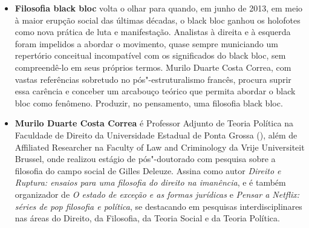 \begin{itemize}
\item \textbf{Filosofia black bloc} volta o olhar para quando, em junho de
2013, em meio à maior erupção social das últimas décadas, o black
bloc ganhou os holofotes como nova prática de luta e manifestação. Analistas
à direita e à esquerda foram impelidos a abordar o movimento,
quase sempre municiando um repertório conceitual incompatível com os
significados do black bloc, sem compreendê-lo em seus próprios termos.
Murilo Duarte Costa Correa, com vastas referências sobretudo no pós"-estruturalismo
francês, procura suprir essa carência e conceber um arcabouço
teórico que permita abordar o black bloc como fenômeno. Produzir, no
pensamento, uma filosofia black bloc.


\item \textbf{Murilo Duarte Costa Correa} é Professor Adjunto de Teoria
Política na Faculdade de Direito da Universidade Estadual de Ponta Grossa
(), além de Affiliated Researcher na Faculty of Law and Criminology
da Vrije Universiteit Brussel, onde realizou estágio de pós"-doutorado com
pesquisa sobre a filosofia do campo social de Gilles Deleuze. Assina como autor
\emph{Direito e Ruptura: ensaios para uma filosofia do direito na
imanência}, e é também organizador de \emph{O estado de exceção e as formas jurídicas}
e \emph{Pensar a Netflix: séries de pop filosofia e política}, se destacando
em pesquisas interdisciplinares nas áreas do Direito, da Filosofia, da Teoria
Social e da Teoria Política.
\end{itemize}

